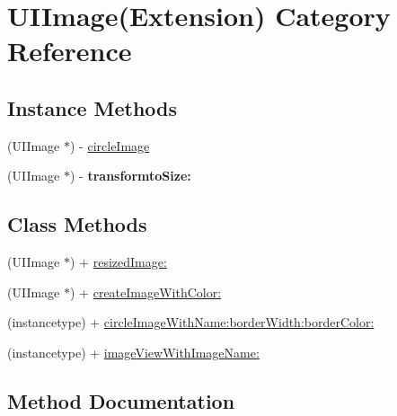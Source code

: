 \hypertarget{category_u_i_image_07_extension_08}{}\section{U\+I\+Image(Extension) Category Reference}
\label{category_u_i_image_07_extension_08}
\subsection*{Instance Methods}
\begin{DoxyCompactItemize}
\item 
(U\+I\+Image $\ast$) -\/ \mbox{\hyperlink{category_u_i_image_07_extension_08_a8c63c67df30939cb1e7483b65d9c5475}{circle\+Image}}
\item 
\mbox{\label{category_u_i_image_07_extension_08_af0816855e6f9a74d3e02149ce724f341}} 
(U\+I\+Image $\ast$) -\/ {\bfseries transformto\+Size\+:}
\end{DoxyCompactItemize}
\subsection*{Class Methods}
\begin{DoxyCompactItemize}
\item 
(U\+I\+Image $\ast$) + \mbox{\hyperlink{category_u_i_image_07_extension_08_a66ae92ad504bc54225e9968cdcce6359}{resized\+Image\+:}}
\item 
(U\+I\+Image $\ast$) + \mbox{\hyperlink{category_u_i_image_07_extension_08_a51d90b6f3cb68434349fac87d008350f}{create\+Image\+With\+Color\+:}}
\item 
(instancetype) + \mbox{\hyperlink{category_u_i_image_07_extension_08_a0014eeec879f963815ecb57c64ac0a55}{circle\+Image\+With\+Name\+:border\+Width\+:border\+Color\+:}}
\item 
(instancetype) + \mbox{\hyperlink{category_u_i_image_07_extension_08_a274f190ca2b3c27f98183412c8b25d95}{image\+View\+With\+Image\+Name\+:}}
\end{DoxyCompactItemize}


\subsection{Method Documentation}
\mbox{\label{category_u_i_image_07_extension_08_a8c63c67df30939cb1e7483b65d9c5475}} 
